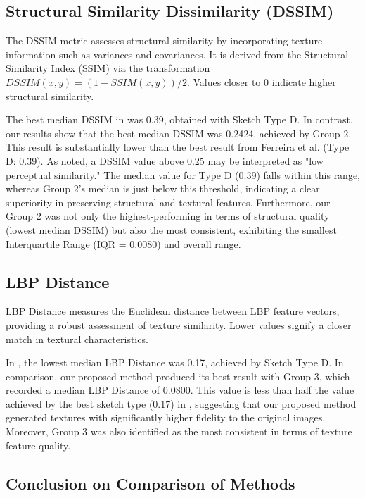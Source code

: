 \documentclass{ieeeaccess}
\begin{document}
\subsection{Structural Similarity Dissimilarity (DSSIM)}

The DSSIM metric assesses structural similarity by incorporating texture information such as variances and covariances. It is derived from the Structural Similarity Index (SSIM) via the transformation $DSSIM(x, y) = (1 - SSIM(x, y))/2$. Values closer to 0 indicate higher structural similarity.

The best median DSSIM in \cite{ref19} was 0.39, obtained with Sketch Type D. In contrast, our results show that the best median DSSIM was 0.2424, achieved by Group 2. This result is substantially lower than the best result from Ferreira et al. (Type D: 0.39). As noted, a DSSIM value above 0.25 may be interpreted as "low perceptual similarity." The median value for Type D (0.39) falls within this range, whereas Group 2's median is just below this threshold, indicating a clear superiority in preserving structural and textural features. Furthermore, our Group 2 was not only the highest-performing in terms of structural quality (lowest median DSSIM) but also the most consistent, exhibiting the smallest Interquartile Range (IQR = 0.0080) and overall range.

\subsection{LBP Distance}

LBP Distance measures the Euclidean distance between LBP feature vectors, providing a robust assessment of texture similarity. Lower values signify a closer match in textural characteristics.

In \cite{ref19}, the lowest median LBP Distance was 0.17, achieved by Sketch Type D. In comparison, our proposed method produced its best result with Group 3, which recorded a median LBP Distance of 0.0800. This value is less than half the value achieved by the best sketch type (0.17) in \cite{ref19}, suggesting that our proposed method generated textures with significantly higher fidelity to the original images. Moreover, Group 3 was also identified as the most consistent in terms of texture feature quality.

\subsection{Conclusion on Comparison of Methods}
\end{document}
